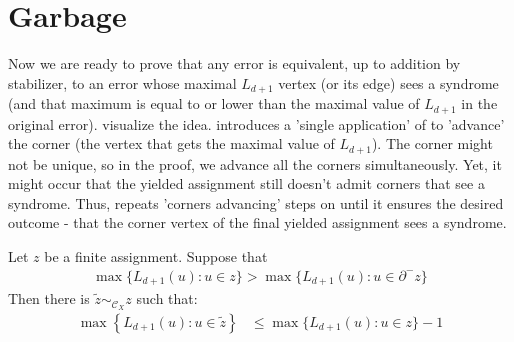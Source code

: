 \section{Garbage}


Now we are ready to prove that any error is equivalent, up to addition by stabilizer, to an error whose maximal $L_{d+1}$ vertex (or its edge) sees a syndrome (and that maximum is equal to or lower than the maximal value of $L_{d+1}$ in the original error).  visualize the idea.  introduces a 'single application' of  to 'advance' the corner (the vertex that gets the maximal value of $L_{d+1}$). The corner might not be unique, so in the proof, we advance all the corners simultaneously. Yet, it might occur that the yielded assignment still doesn't admit corners that see a syndrome. Thus,  repeats  'corners advancing' steps on until it ensures the desired outcome - that the corner vertex of the final yielded assignment sees a syndrome. 
\begin{claim}
  \label{claim:reduce_stab}
  Let $z$ be a finite assignment. Suppose that 
  \begin{equation*}
    \begin{split}
            \max \big\{ L_{d+1}(u) :  u \in z \big\} > \max \big\{ L_{d+1}(u) : u \in \partial^{-} z \big\}
    \end{split}
  \end{equation*}
  Then there is $\tilde{z} \sim_{\mathcal{C}_{X}} z$ such that:
\begin{equation*}
  \begin{split}
    \max \left\{ L_{d+1}(u) : u \in \tilde{z} \right\} & \le  \max \big\{ L_{d+1}(u) : u \in z \big\} - 1
  \end{split}
\end{equation*}
\end{claim}
